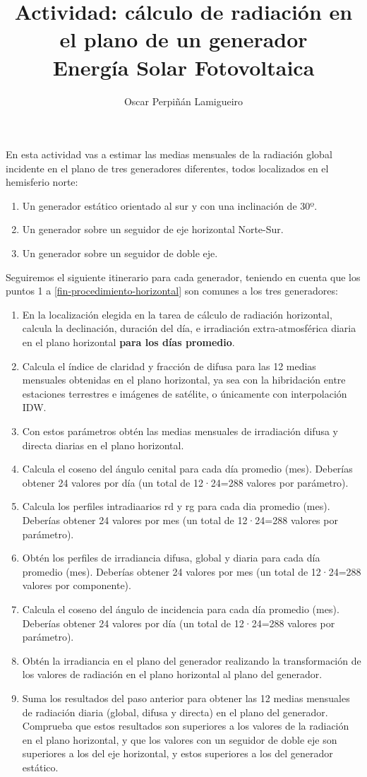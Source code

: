 \documentclass[11pt]{article}
\author{Oscar Perpiñán Lamigueiro}
\date{}
\title{Actividad: cálculo de radiación en el plano de un generador\\\medskip
\large Energía Solar Fotovoltaica}
\begin{document}
\maketitle

En esta actividad vas a estimar las medias mensuales de la radiación
global incidente en el plano de tres generadores diferentes, todos
localizados en el hemisferio norte:
\begin{enumerate}
\item Un generador estático orientado al sur y con una inclinación de
  30º.
\item Un generador sobre un seguidor de eje horizontal Norte-Sur.
\item Un generador sobre un seguidor de doble eje.
\end{enumerate}

Seguiremos el siguiente itinerario para cada generador, teniendo en
cuenta que los puntos 1 a \ref{fin-procedimiento-horizontal} son
comunes a los tres generadores:

\begin{enumerate}
\item En la localización elegida en la tarea de cálculo de radiación
  horizontal, calcula la declinación, duración del día, e irradiación
  extra-atmosférica diaria en el plano horizontal \textbf{para los
    días promedio}.
\item Calcula el índice de claridad y fracción de difusa para las 12
  medias mensuales obtenidas en el plano horizontal, ya sea con la
  hibridación entre estaciones terrestres e imágenes de satélite, o
  únicamente con interpolación IDW. 
\item Con estos parámetros obtén las medias mensuales de irradiación
  difusa y directa diarias en el plano horizontal.
\item Calcula el coseno del ángulo cenital para cada día promedio
  (mes). Deberías obtener 24 valores por día (un total de 12·24=288
  valores por parámetro).
\item Calcula los perfiles intradiaarios rd y rg para cada dia
  promedio (mes). Deberías obtener 24 valores por mes (un total de
  12·24=288 valores por parámetro).
\item Obtén los perfiles de irradiancia difusa, global y diaria para
  cada día promedio (mes). Deberías obtener 24 valores por mes (un
  total de 12·24=288 valores por componente).\label{fin-procedimiento-horizontal}
\item Calcula el coseno del ángulo de incidencia para cada día
  promedio (mes). Deberías obtener 24 valores por día (un total de
  12·24=288 valores por parámetro).
\item Obtén la irradiancia en el plano del generador realizando la
  transformación de los valores de radiación en el plano horizontal al
  plano del generador.
\item Suma los resultados del paso anterior para obtener las 12 medias
  mensuales de radiación diaria (global, difusa y directa) en el plano
  del generador. Comprueba que estos resultados son superiores a los
  valores de la radiación en el plano horizontal, y que los valores
  con un seguidor de doble eje son superiores a los del eje
  horizontal, y estos superiores a los del generador estático.
\end{enumerate}
\end{document}
